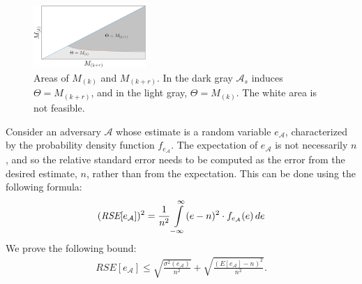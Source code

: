 \begin{figure}[b]
    \begin{center}
        \includegraphics[width=0.38\textwidth]{graphics/fast-concurrent/areaGraph.png}
    \end{center}
    \caption{Areas of $M_{(k)}$ and $M_{(k+r)}$. In the dark gray 
    ${\mathcal{A}}_s$ induces $\Theta=M_{(k+r)}$, and in the light gray, $\Theta=M_{(k)}$. The white
    area is not feasible.} %
    \label{fc-fig:areaGraph}
\end{figure}

Consider an adversary $\mathcal{A}$ whose estimate is a random variable $e_{\mathcal{A}}$,
characterized by the probability density function $f_{e_{\mathcal{A}}}$.
The expectation of $e_{\mathcal{A}}$ is not necessarily $n$, and so the relative standard error needs to be computed as the error from the desired estimate, $n$, rather than from the expectation. This can be done using the following formula:
\[
    (\textit{RSE}[e_{\mathcal{A}}])^2 = \frac{1}{n^2} \int\limits_{-\infty}^{\infty} (e - n)^2 \cdot f_{e_{\mathcal{A}}}(e) \,de 
\]
We prove
the following bound:
\begin{align*}
    \textit{RSE}[e_{\mathcal{A}}] \leq \sqrt{\frac{\sigma^2(e_{\mathcal{A}})}{n^2}} + \sqrt{\frac{(E[e_{\mathcal{A}}] - n)^2}{n^2}}.
\end{align*}

